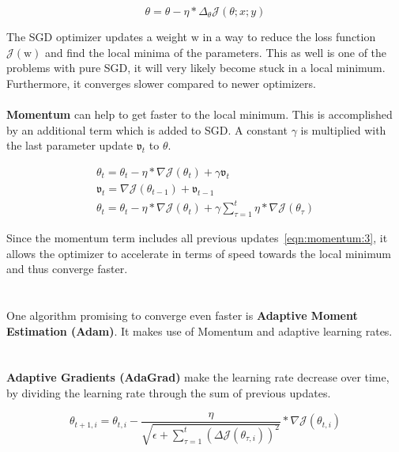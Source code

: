 \begin{equation}
    \theta = \theta - \eta * \Delta_\theta\mathcal{J}(\theta;x;y)
    \label{eqn:sgd}
\end{equation}


The SGD optimizer updates a weight $\mathrm{w}$ in a way to reduce the loss function $\mathcal{J}(\mathrm{w})$ and find
the local minima of the parameters.
This as well is one of the problems with pure SGD, it will very likely become stuck in a local minimum.
Furthermore, it converges slower compared to newer optimizers.
\\\mbox{}\\
\textbf{Momentum} can help to get faster to the local minimum.
This is accomplished by an additional term which is added to SGD.
A constant $\gamma$ is multiplied with the last parameter update $\mathfrak{v}_t$ to $\theta$.

\begin{align}
    \theta_t = \theta_t - \eta * \nabla\mathcal{J}(\theta_{t})+\gamma\mathfrak{v}_{t} \label{eqn:momentum:1}\\
    \mathfrak{v}_t = \nabla\mathcal{J}(\theta_{t-1})+\mathfrak{v}_{t-1} \label{eqn:momentum:2}\\
    \theta_t= \theta_t - \eta * \nabla\mathcal{J}(\theta_{t})+\gamma\sum_{\tau=1}^{t}\eta * \nabla\mathcal{J}(\theta_{\tau}) \label{eqn:momentum:3}
\end{align}

Since the momentum term includes all previous updates~\ref{eqn:momentum:3}, it allows the optimizer to accelerate in terms of speed towards
the local minimum and thus converge faster.\\
\\\mbox{}\\
One algorithm promising to converge even faster is \textbf{Adaptive Moment Estimation (Adam)}.
It makes use of Momentum and adaptive learning rates.\\
\\\mbox{}\\
\textbf{Adaptive Gradients (AdaGrad)} make the learning rate decrease over time, by dividing the learning rate through the sum
of previous updates.

\begin{equation}
    \theta_{t+1,i} = \theta_{t,i} - \frac{\eta}{\sqrt{\epsilon+\sum_{\tau=1}^{t}(\Delta\mathcal{J}(\theta_{\tau,i}))^2}} * \nabla\mathcal{J}(\theta_{t,i})
    \label{eqn:adagrad}
\end{equation}

